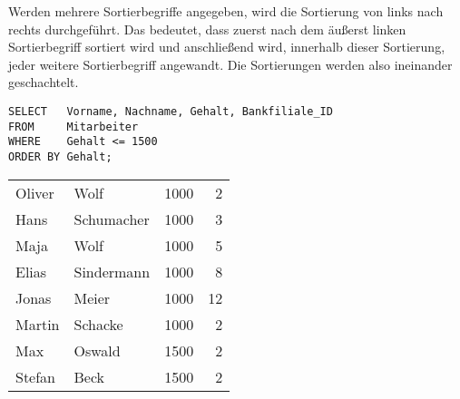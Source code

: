         \begin{merke}
          Werden mehrere Sortierbegriffe angegeben, wird die Sortierung von links nach rechts durchgeführt. Das bedeutet, dass zuerst nach dem äußerst linken Sortierbegriff sortiert wird und anschließend wird, innerhalb dieser Sortierung, jeder weitere Sortierbegriff angewandt. Die Sortierungen werden also ineinander geschachtelt.
        \end{merke}
        \begin{lstlisting}[language=oracle_sql,caption={Die ORDER BY Klausel mit Spaltenbezeichnern},label=sql02_15]
SELECT   Vorname, Nachname, Gehalt, Bankfiliale_ID
FROM     Mitarbeiter
WHERE    Gehalt <= 1500
ORDER BY Gehalt;
        \end{lstlisting}
        \begin{center}
          \begin{small}
            \tablehead{}
            \begin{msoraclesql}
              \begin{supertabular}{llrr}
                Oliver & Wolf & 1000 & 2 \\
                Hans & Schumacher & 1000 & 3 \\
                Maja & Wolf & 1000 & 5 \\
                Elias & Sindermann & 1000 & 8 \\
                Jonas & Meier & 1000 & 12 \\
                Martin & Schacke & 1000 & 2 \\
                Max & Oswald & 1500 & 2 \\
                Stefan & Beck & 1500 & 2\\
              \end{supertabular}
            \end{msoraclesql}
          \end{small}
        \end{center}

